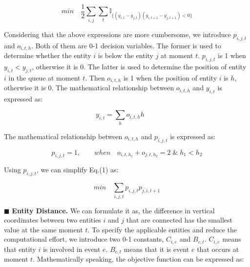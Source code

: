 \documentclass[review,journal]{vgtc}         %
\begin{document}
\begin{equation}
min \quad  \frac{1}{2}\sum_{i,j}\sum_{t}\mathbb{I}_{\{(y_{i,t}-y_{j,t})(y_{i,t+1}-y_{j,t+1})<0 \}}
\end{equation}

Considering that the above expressions are more cumbersome, we introduce $p_{i,j,t}$ and $o_{i,t,h}$. Both of them are 0-1 decision variables. The former is used to determine whether the entity $i$ is below the entity $j$ at moment $t$. $p_{i,j,t}$ is 1 when $y_{i,t}<y_{j,t}$, otherwise it is 0. The latter is used to determine the position of entity $i$ in the queue at moment $t$. Then $o_{i,t,h}$ is 1 when the position of entity $i$ is $h$, otherwise it is 0. The mathematical relationship between $o_{i,t,h}$ and $y_{i,t}$ is expressed as:

\begin{equation}
y_{i,t} =  \sum_{h}o_{i,t,h}h \quad\quad
\end{equation}


\noindent The mathematical relationship between $o_{i,t,h}$ and $p_{i,j,t}$ is expressed as:

\begin{equation}
p_{i,j,t} = 1, \quad\quad when\quad o_{i,t,h_1} + o_{j,t,h_2}=2\;\&\;h_1<h_2
\end{equation}

\noindent Using $p_{i,j,t}$, we can simplify Eq.(1) as:

\begin{equation}
min \quad \sum_{i,j,t}p_{i,j,t}p_{j,i,t+1}
\end{equation}

$\blacksquare$ \textbf{Entity Distance.} We can formulate it as, the difference in vertical coordinates between two entities $i$ and $j$ that are connected has the smallest value at the same moment $t$. To specify the applicable entities and reduce the computational effort, we introduce two 0-1 constants, $C_{i,e}$ and $B_{e,t}$. $C_{i,e}$ means that entity $i$ is involved in event $e$. $B_{e,t}$ means that it is event $e$ that occurs at moment $t$. Mathematically speaking, the objective function can be expressed as:
\end{document}
